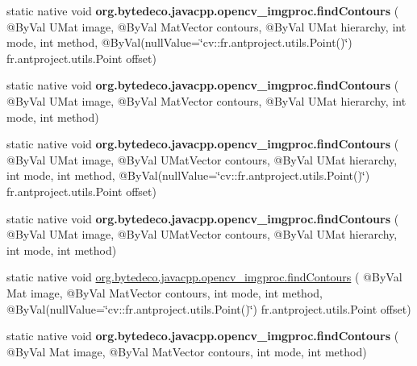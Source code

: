 \begin{DoxyCompactItemize}
\item 
\mbox{\label{group__imgproc__shape_ga26b5d7abef556a54da3c295fe355a1e1}} 
static native void {\bfseries org.\+bytedeco.\+javacpp.\+opencv\+\_\+imgproc.\+find\+Contours} ( @By\+Val U\+Mat image, @By\+Val Mat\+Vector contours, @By\+Val U\+Mat hierarchy, int mode, int method, @By\+Val(null\+Value=\char`\"{}cv\+::\+fr.antproject.utils.Point()\char`\"{}) fr.antproject.utils.Point offset)
\item 
\mbox{\label{group__imgproc__shape_ga475333c1bd51ec2b3c72f5849c294ce2}} 
static native void {\bfseries org.\+bytedeco.\+javacpp.\+opencv\+\_\+imgproc.\+find\+Contours} ( @By\+Val U\+Mat image, @By\+Val Mat\+Vector contours, @By\+Val U\+Mat hierarchy, int mode, int method)
\item 
\mbox{\label{group__imgproc__shape_ga666cc59514d27b672aa1e7d6942b7f98}} 
static native void {\bfseries org.\+bytedeco.\+javacpp.\+opencv\+\_\+imgproc.\+find\+Contours} ( @By\+Val U\+Mat image, @By\+Val U\+Mat\+Vector contours, @By\+Val U\+Mat hierarchy, int mode, int method, @By\+Val(null\+Value=\char`\"{}cv\+::\+fr.antproject.utils.Point()\char`\"{}) fr.antproject.utils.Point offset)
\item 
\mbox{\label{group__imgproc__shape_ga6ef8f480fda759a0611e6a3f4660e520}} 
static native void {\bfseries org.\+bytedeco.\+javacpp.\+opencv\+\_\+imgproc.\+find\+Contours} ( @By\+Val U\+Mat image, @By\+Val U\+Mat\+Vector contours, @By\+Val U\+Mat hierarchy, int mode, int method)
\item 
static native void \hyperlink{group__imgproc__shape_ga9242b107e02badf32d704830cda84585}{org.\+bytedeco.\+javacpp.\+opencv\+\_\+imgproc.\+find\+Contours} ( @By\+Val Mat image, @By\+Val Mat\+Vector contours, int mode, int method, @By\+Val(null\+Value=\char`\"{}cv\+::\+fr.antproject.utils.Point()\char`\"{}) fr.antproject.utils.Point offset)
\item 
\mbox{\label{group__imgproc__shape_ga902eb6627cfe9fe9909503672730d0f5}} 
static native void {\bfseries org.\+bytedeco.\+javacpp.\+opencv\+\_\+imgproc.\+find\+Contours} ( @By\+Val Mat image, @By\+Val Mat\+Vector contours, int mode, int method)
\item 
\mbox{\label{group__imgproc__shape_ga0d4a57c0961e15ad326f3cffb2005621}} 

\end{DoxyCompactItemize}
